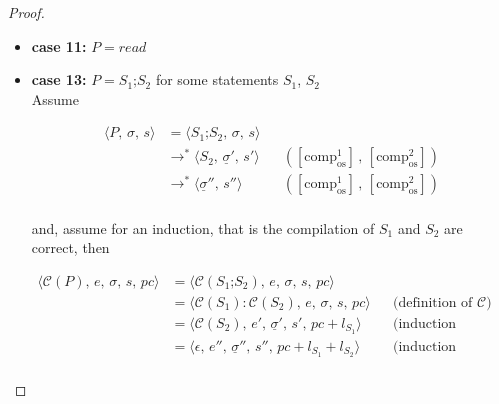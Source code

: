 \documentclass{article}
\begin{document}
\begin{proof}
\begin{itemize}
\[\begin{aligned}
  \end{aligned}
\]

Similar to our proof of the correctness of \texttt{while}-statements, this assumes a finite depth of recursion (0, if there is no recursion) as we have assumed termination. \\


  \item \textbf{case 11:} $P = read$

  \item \textbf{case 13:} $P = S_1\texttt{;}S_2$ for some statements $S_1$, $S_2$\\

    Assume

    \[
      \begin{aligned}
      \langle P,\, \sigma,\, s \rangle
      &=\langle S_1\texttt{;}S_2,\, \sigma,\, s \rangle \\
      &\rightarrow^\ast \langle S_2,\, \underline{\sigma}' ,\, s' \rangle
      && ([\text{comp}^1_{\text{os}}] \,,\, [\text{comp}^2_{\text{os}}])   \\
      &\rightarrow^\ast \langle \underline{\sigma}'' ,\, s'' \rangle
      && ([\text{comp}^1_{\text{os}}] \,,\, [\text{comp}^2_{\text{os}}]) \\
      \end{aligned}
  \]
  
  and, assume for an induction, that is the compilation of $S_1$ and $S_2$ are correct, then

  \[
      \begin{aligned}
      \langle \mathcal{C}(P),\, e,\, \sigma,\, s,\, pc \rangle
      &= \langle \mathcal{C}(S_1\texttt{;}S_2),\, e,\, \sigma,\, s,\, pc \rangle \\
      &= \langle \mathcal{C}(S_1) : \mathcal{C}(S_2) ,\, e,\, \sigma,\, s,\, pc \rangle
      && \text{(definition of $\mathcal{C}$)} \\   
      &= \langle \mathcal{C}(S_2) ,\, e',\, \underline{\sigma}' ,\, s',\, pc + l_{S_1} \rangle
      && \text{(induction hypothesis 1)} \\   
      &= \langle \epsilon ,\, e'',\, \underline{\sigma}'' ,\, s'',\, pc + l_{S_1} + l_{S_2} \rangle
      && \text{(induction hypothesis 2)} \\ 
      \end{aligned}
  \]


\end{itemize}
\end{proof}
\end{document}
